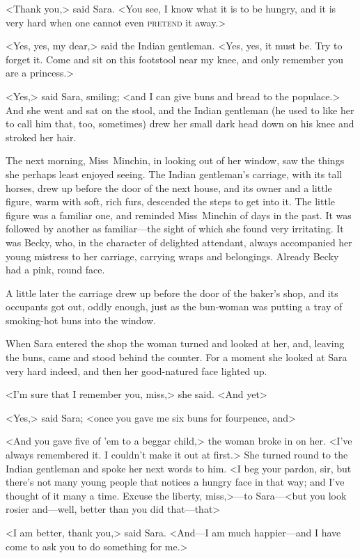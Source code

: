 <Thank you,> said Sara. <You see, I know what it is to be hungry, and it is very hard when one cannot even \textsc{pretend} it away.>

<Yes, yes, my dear,> said the Indian gentleman. <Yes, yes, it must be. Try to forget it. Come and sit on this footstool near my knee, and only remember you are a princess.>

<Yes,> said Sara, smiling; <and I can give buns and bread to the populace.> And she went and sat on the stool, and the Indian gentleman (he used to like her to call him that, too, sometimes) drew her small dark head down on his knee and stroked her hair.

The next morning, Miss~Minchin, in looking out of her window, saw the things she perhaps least enjoyed seeing. The Indian gentleman's carriage, with its tall horses, drew up before the door of the next house, and its owner and a little figure, warm with soft, rich furs, descended the steps to get into it. The little figure was a familiar one, and reminded Miss~Minchin of days in the past. It was followed by another as familiar—the sight of which she found very irritating. It was Becky, who, in the character of delighted attendant, always accompanied her young mistress to her carriage, carrying wraps and belongings. Already Becky had a pink, round face.

A little later the carriage drew up before the door of the baker's shop, and its occupants got out, oddly enough, just as the bun-woman was putting a tray of smoking-hot buns into the window.

When Sara entered the shop the woman turned and looked at her, and, leaving the buns, came and stood behind the counter. For a moment she looked at Sara very hard indeed, and then her good-natured face lighted up.

<I'm sure that I remember you, miss,> she said. <And yet\longdash>

<Yes,> said Sara; <once you gave me six buns for fourpence, and\longdash>

<And you gave five of 'em to a beggar child,> the woman broke in on her. <I've always remembered it. I couldn't make it out at first.> She turned round to the Indian gentleman and spoke her next words to him. <I beg your pardon, sir, but there's not many young people that notices a hungry face in that way; and I've thought of it many a time. Excuse the liberty, miss,>—to Sara—<but you look rosier and—well, better than you did that—that\longdash>

<I am better, thank you,> said Sara. <And—I am much happier—and I have come to ask you to do something for me.>

